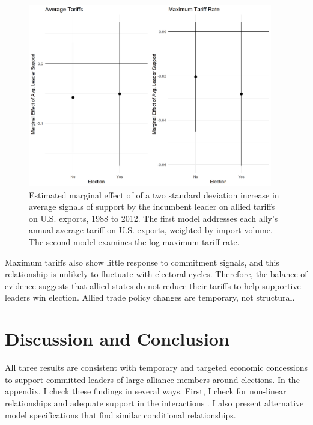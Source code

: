 \documentclass[12pt]{article}
\begin{document}
\begin{figure}[htpb]
	\centering
		\includegraphics[width=0.95\textwidth]{../figures/tariff-me.png}
	\caption{Estimated marginal effect of of a two standard deviation increase in average signals of support by the incumbent leader on allied tariffs on U.S. exports, 1988 to 2012. The first model addresses each ally's annual average tariff on U.S. exports, weighted by import volume. The second model examines the log maximum tariff rate.}
	\label{fig:tariff-me}
\end{figure}


Maximum tariffs also show little response to commitment signals, and this relationship is unlikely to fluctuate with electoral cycles.
Therefore, the balance of evidence suggests that allied states do not reduce their tariffs to help supportive leaders win election.
Allied trade policy changes are temporary, not structural.


\section{Discussion and Conclusion}


All three results are consistent with temporary and targeted economic concessions to support committed leaders of large alliance members around elections. 
In the appendix, I check these findings in several ways.
First, I check for non-linear relationships and adequate support in the interactions \citep{Hainmuelleretal2019}. 
I also present alternative model specifications that find similar conditional relationships.
\end{document}
